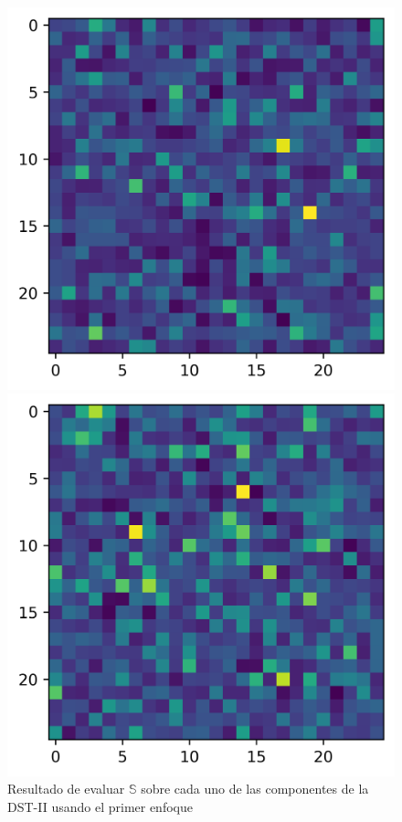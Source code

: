 \begin{figure}
\begin{multicols}{2}
    \end{multicols}
\begin{multicols}{2}
    \includegraphics[width=\linewidth]{Graphics/gaussian-2d-experiment-vertical.png}\par
    \includegraphics[width=\linewidth]{Graphics/gaussian-2d-experiment-diagonal.png}\par
\end{multicols}
\caption{Resultado de evaluar $\mathbb{S}$ sobre cada uno de las componentes de la DST-II usando el primer enfoque} \label{fig:gaussian-example-approach1}
\end{figure}


